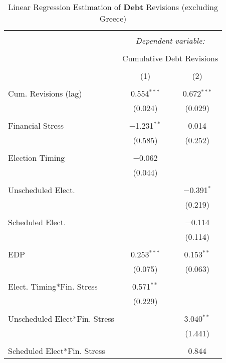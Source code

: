 
\begin{table}[!htbp] \centering 
  \caption{Linear Regression Estimation of \textbf{Debt} Revisions (excluding Greece)} 
  \label{debt_no_greece_results} 
\small 
\begin{tabular}{@{\extracolsep{5pt}}lcc} 
\\[-1.8ex]\hline 
\hline \\[-1.8ex] 
 & \multicolumn{2}{c}{\textit{Dependent variable:}} \\ 
\cline{2-3} 
\\[-1.8ex] & \multicolumn{2}{c}{Cumulative Debt Revisions} \\ 
\\[-1.8ex] & (1) & (2)\\ 
\hline \\[-1.8ex] 
 Cum. Revisions (lag) & 0.554$^{***}$ & 0.672$^{***}$ \\ 
  & (0.024) & (0.029) \\ 
  & & \\ 
 Financial Stress & $-$1.231$^{**}$ & 0.014 \\ 
  & (0.585) & (0.252) \\ 
  & & \\ 
 Election Timing & $-$0.062 &  \\ 
  & (0.044) &  \\ 
  & & \\ 
 Unscheduled Elect. &  & $-$0.391$^{*}$ \\ 
  &  & (0.219) \\ 
  & & \\ 
 Scheduled Elect. &  & $-$0.114 \\ 
  &  & (0.114) \\ 
  & & \\ 
 EDP & 0.253$^{***}$ & 0.153$^{**}$ \\ 
  & (0.075) & (0.063) \\ 
  & & \\ 
 Elect. Timing*Fin. Stress & 0.571$^{**}$ &  \\ 
  & (0.229) &  \\ 
  & & \\ 
 Unscheduled Elect*Fin. Stress &  & 3.040$^{**}$ \\ 
  &  & (1.441) \\ 
  & & \\ 
 Scheduled Elect*Fin. Stress &  & 0.844 \\ 

\end{tabular}
\end{table}
